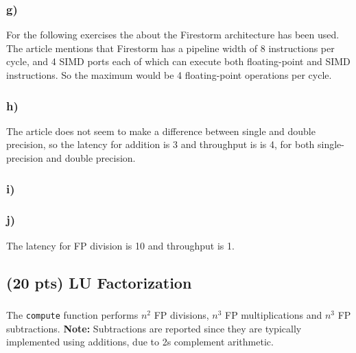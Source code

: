 \documentclass[tikz,14pt,fleqn]{article}
\begin{document}
\subsubsection*{g)}
For the following exercises the  about the Firestorm architecture has been used. The article mentions that Firestorm has a pipeline width of 8 instructions per cycle, and 4 SIMD ports each of which can execute both floating-point and SIMD instructions. So the maximum would be 4 floating-point operations per cycle.
\subsubsection*{h)}
The article does not seem to make a difference between single and double precision, so the latency for addition is 3 and throughput is is 4, for both single-precision and double precision.
\subsubsection*{i)}

\subsubsection*{j)}
The latency for FP division is 10 and throughput is 1.


\subsection{(20 pts) LU Factorization}
\subsubsection{} %

\subsubsection{} %
The \texttt{compute} function performs $n^2$ FP divisions, $n^3$ FP multiplications and $n^3$ FP subtractions. \textbf{Note:} Subtractions are reported since they are typically implemented using additions, due to 2s complement arithmetic.
\end{document}
